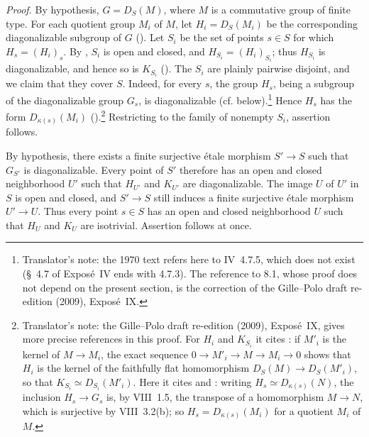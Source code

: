 \emph{Proof.}
 By hypothesis, \(G=D_S(M)\), where \(M\) is a commutative group of
finite type. For each quotient group \(M_i\) of \(M\), let
\(H_i=D_S(M_i)\) be the corresponding diagonalizable subgroup of \(G\)
(). Let \(S_i\) be the set of points \(s\in S\) for which
\(H_s=(H_i)_s\). By , \(S_i\)
is open and closed, and \(H_{S_i}=(H_i)_{S_i}\); thus \(H_{S_i}\) is
diagonalizable, and hence so is \(K_{S_i}\) (). The \(S_i\) are
plainly pairwise disjoint, and we claim that they cover \(S\). Indeed, for
every \(s\), the group \(H_s\), being a subgroup of the diagonalizable
group \(G_s\), is diagonalizable (cf.  below).\footnote{Translator's note: the 1970 text refers here to IV~4.7.5, which does not exist (\S~4.7 of Expos\'e~IV ends with 4.7.3). The reference to 8.1, whose proof does not depend on the present section, is the correction of the Gille--Polo draft re-edition (2009), Expos\'e~IX.}
Hence \(H_s\) has the form \(D_{\kappa(s)}(M_i)\) ().\footnote{Translator's note: the Gille--Polo draft re-edition (2009), Expos\'e~IX, gives more precise references in this proof. For \(H_i\) and \(K_{S_i}\) it cites : if \(M'_i\) is the kernel of \(M\to M_i\), the exact sequence \(0\to M'_i\to M\to M_i\to0\) shows that \(H_i\) is the kernel of the faithfully flat homomorphism \(D_S(M)\to D_S(M'_i)\), so that \(K_{S_i}\simeq D_{S_i}(M'_i)\). Here it cites  and : writing \(H_s\simeq D_{\kappa(s)}(N)\), the inclusion \(H_s\to G_s\) is, by VIII~1.5, the transpose of a homomorphism \(M\to N\), which is surjective by VIII~3.2(b); so \(H_s=D_{\kappa(s)}(M_i)\) for a quotient \(M_i\) of \(M\).} Restricting to the family of nonempty \(S_i\), assertion 
follows.

 By hypothesis, there exists a finite surjective \'etale morphism
\(S'\to S\) such that \(G_{S'}\) is diagonalizable. Every point of \(S'\)
therefore has an open and closed neighborhood \(U'\) such that \(H_{U'}\)
and \(K_{U'}\) are diagonalizable. The image \(U\) of \(U'\) in \(S\) is
open and closed, and \(S'\to S\) still induces a finite surjective
\'etale
morphism \(U'\to U\). Thus every point \(s\in S\) has an open and closed
neighborhood \(U\) such that \(H_U\) and \(K_U\) are isotrivial.
Assertion  follows at once.

